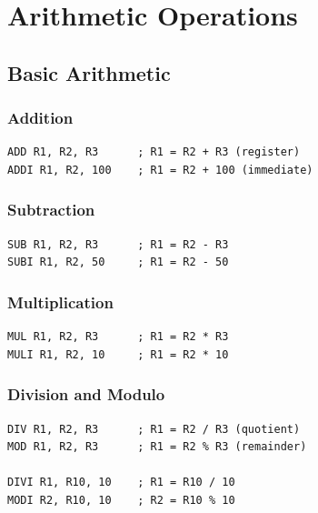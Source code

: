 \documentclass[12pt,a4paper,oneside]{book}
\begin{document}
\chapter{Arithmetic Operations}

\section{Basic Arithmetic}

\subsection{Addition}

\begin{lstlisting}[style=assembly]
ADD R1, R2, R3      ; R1 = R2 + R3 (register)
ADDI R1, R2, 100    ; R1 = R2 + 100 (immediate)
\end{lstlisting}

\subsection{Subtraction}

\begin{lstlisting}[style=assembly]
SUB R1, R2, R3      ; R1 = R2 - R3
SUBI R1, R2, 50     ; R1 = R2 - 50
\end{lstlisting}

\subsection{Multiplication}

\begin{lstlisting}[style=assembly]
MUL R1, R2, R3      ; R1 = R2 * R3
MULI R1, R2, 10     ; R1 = R2 * 10
\end{lstlisting}

\subsection{Division and Modulo}

\begin{lstlisting}[style=assembly]
DIV R1, R2, R3      ; R1 = R2 / R3 (quotient)
MOD R1, R2, R3      ; R1 = R2 % R3 (remainder)

DIVI R1, R10, 10    ; R1 = R10 / 10
MODI R2, R10, 10    ; R2 = R10 % 10
\end{lstlisting}
\end{document}
